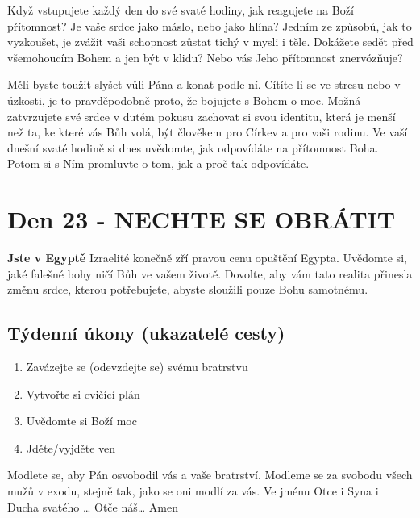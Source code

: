\documentclass[11pt]{article}
\newcommand{\zacatekCtvrtyTyden}{
  \textbf{Jste v Egyptě} \newline
  Izraelité konečně zří pravou cenu opuštění Egypta. Uvědomte si, jaké falešné bohy ničí Bůh ve vašem životě.
Dovolte, aby vám tato realita přinesla změnu srdce, kterou potřebujete, abyste sloužili pouze Bohu samotnému.

\subsection*{Týdenní úkony (ukazatelé cesty)}
\begin{enumerate}
  \item Zavázejte se (odevzdejte se) svému bratrstvu
  \item Vytvořte si cvičící plán
  \item Uvědomte si Boží moc
  \item Jděte/vyjděte ven
\end{enumerate}
Modlete se, aby Pán osvobodil vás a vaše bratrství. \newline
Modleme se za svobodu všech mužů v exodu, stejně tak, jako se oni modlí za vás.\newline
Ve jménu Otce i Syna i Ducha svatého …  Otče náš… Amen
}
\begin{document}
Když vstupujete každý den do své svaté hodiny, jak reagujete na Boží přítomnost? Je vaše srdce jako máslo, nebo
jako hlína? Jedním ze způsobů, jak to vyzkoušet, je zvážit vaši schopnost zůstat tichý v mysli i těle. Dokážete sedět
před všemohoucím Bohem a jen být v klidu? Nebo vás Jeho přítomnost znervózňuje?

Měli byste toužit slyšet vůli Pána a konat podle ní. Cítíte-li se ve stresu nebo v úzkosti, je to pravděpodobně proto,
že bojujete s Bohem o moc. Možná zatvrzujete své srdce v dutém pokusu zachovat si svou identitu, která je menší
než ta, ke které vás Bůh volá, být člověkem pro Církev a pro vaši rodinu. Ve vaší dnešní svaté hodině si dnes
uvědomte, jak odpovídáte na přítomnost Boha. Potom si s Ním promluvte o tom, jak a proč tak odpovídáte.

\newpage
\section{Den 23 - NECHTE SE OBRÁTIT}
\zacatekCtvrtyTyden
\end{document}
